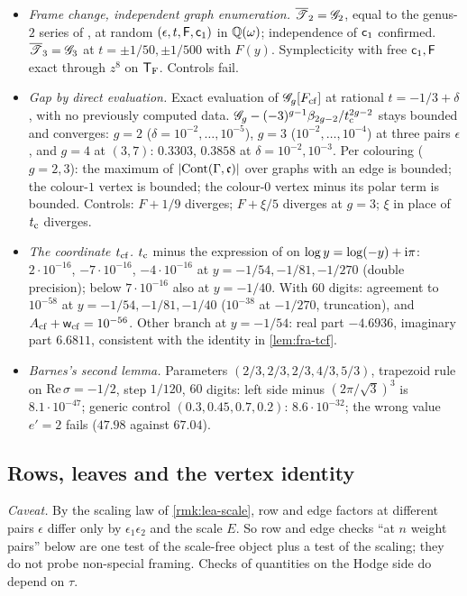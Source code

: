 \begin{itemize}
\item \emph{Frame change, independent graph enumeration.} $\overline{\mathscr{T}}_2=\mathscr{G}_2$, equal to the genus-$2$ series of \cite{BS}, at random $(\epsilon,t,\mathsf{F},\mathsf{c}_{1})$ in $\mathbb{Q}(\omega)$; independence of $\mathsf{c}_{1}$ confirmed. $\overline{\mathscr{T}}_3=\mathscr{G}_3$ at $t=\pm1/50,\pm1/500$ with $F(y)$. Symplecticity with free $\mathsf{c}_{1},\mathsf{F}$ exact through $z^8$ on $\mathsf{T}_{\mathrm{F}}$. Controls fail.
\item \emph{Gap by direct evaluation.} Exact evaluation of $\mathscr{G}_g[F_{\mathrm{cf}}]$ at rational $t=-1/3+\delta$, with no previously computed data. $\mathscr{G}_g-(-3)^{g-1}\beta_{2g-2}/t_{\mathrm{c}}^{2g-2}$ stays bounded and converges: $g=2$ ($\delta=10^{-2},\dots,10^{-5}$), $g=3$ ($10^{-2},\dots,10^{-4}$) at three pairs $\epsilon$, and $g=4$ at $(3,7)$: $0.3303$, $0.3858$ at $\delta=10^{-2},10^{-3}$. Per colouring ($g=2,3$): the maximum of $|\mathrm{Cont}(\Gamma,\mathfrak{c})|$ over graphs with an edge is bounded; the colour-$1$ vertex is bounded; the colour-$0$ vertex minus its polar term is bounded. Controls: $F+1/9$ diverges; $F+\xi/5$ diverges at $g=3$; $\xi$ in place of $t_{\mathrm{c}}$ diverges.
\item \emph{The coordinate $t_{\mathrm{cf}}$.} $t_{\mathrm{c}}$ minus the expression of \cite{BS} on $\log y=\log(-y)+\mathrm{i}\pi$: $2\cdot 10^{-16}$, $-7\cdot 10^{-16}$, $-4\cdot 10^{-16}$ at $y=-1/54,-1/81,-1/270$ (double precision); below $7\cdot 10^{-16}$ also at $y=-1/40$. With $60$ digits: agreement to $10^{-58}$ at $y=-1/54,-1/81,-1/40$ ($10^{-38}$ at $-1/270$, truncation), and $A_{\mathrm{cf}}+\mathsf{w}_{\mathrm{cf}}=10^{-56}$. Other branch at $y=-1/54$: real part $-4.6936$, imaginary part $6.6811$, consistent with the identity in \cref{lem:fra-tcf}.
\item \emph{Barnes's second lemma.} Parameters $(2/3,2/3,2/3,4/3,5/3)$, trapezoid rule on $\mathrm{Re}\,\sigma=-1/2$, step $1/120$, $60$ digits: left side minus $(2\pi/\sqrt3)^3$ is $8.1\cdot 10^{-47}$; generic control $(0.3,0.45,0.7,0.2)$: $8.6\cdot 10^{-32}$; the wrong value $e'=2$ fails ($47.98$ against $67.04$).
\end{itemize}

\subsection{Rows, leaves and the vertex identity}
\label{sec:evi-rows}

\emph{Caveat.} By the scaling law of \cref{rmk:lea-scale}, row and edge factors at different pairs $\epsilon$ differ only by $\epsilon_1\epsilon_2$ and the scale $E$. So row and edge checks ``at $n$ weight pairs'' below are one test of the scale-free object plus a test of the scaling; they do not probe non-special framing. Checks of quantities on the Hodge side do depend on $\tau$.

